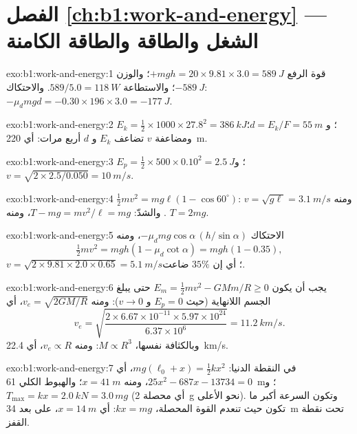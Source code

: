 \section*{الفصل \ref{ch:b1:work-and-energy} --- الشغل والطاقة والطاقة الكامنة}

\begin{solution}{exo:b1:work-and-energy:1}
قوة الرفع $+mgh = 20 \times 9.81 \times 3.0 = \qty{589}{J}$؛ والوزن
$-\qty{589}{J}$؛ والاستطاعة $589/5.0 = \qty{118}{W}$. والاحتكاك: $-\mu_dmgd =
-0.30 \times 196 \times 3.0 = \qty{-177}{J}$.
\end{solution}

\begin{solution}{exo:b1:work-and-energy:2}
$E_k = \tfrac12 \times 1000 \times 27.8^2 = \qty{386}{kJ}$؛ و $d = E_k/F =
\qty{55}{m}$؛ ومضاعفة $v$ تضاعف $E_k$ و $d$ أربع مرات: أي \qty{220}{m}.
\end{solution}

\begin{solution}{exo:b1:work-and-energy:3}
$E_p = \tfrac12 \times 500 \times 0.10^2 = \qty{2.5}{J}$؛ و $v = \sqrt{2 \times
2.5/0.050} = \qty{10}{m/s}$.
\end{solution}

\begin{solution}{exo:b1:work-and-energy:4}
$\tfrac12 mv^2 = mg\ell(1 - \cos 60^\circ)$: ومنه $v = \sqrt{g\ell} = \qty{3.1}{m/s}$.
والشدّ: $T - mg = mv^2/\ell = mg$، ومنه $T = 2mg$.
\end{solution}

\begin{solution}{exo:b1:work-and-energy:5}
 الاحتكاك $-\mu_dmg\cos\alpha\,(h/\sin\alpha)$، ومنه
\[
\tfrac12 mv^2 = mgh(1 - \mu_d\cot\alpha) = mgh(1 - 0.35),
\]
$v = \sqrt{2 \times 9.81 \times 2.0 \times 0.65} = \qty{5.1}{m/s}$؛ أي إن $35\%$ ضاعت.
\end{solution}

\begin{solution}{exo:b1:work-and-energy:6}
يجب أن يكون $E_m = \tfrac12 mv^2 - GMm/R \geq 0$ حتى يبلغ الجسم اللانهاية
(حيث $E_p = 0$ و $v \to 0$): ومنه $v_e = \sqrt{2GM/R}$، أي
\[
v_e = \sqrt{\frac{2 \times 6.67\times10^{-11} \times 5.97\times10^{24}}{6.37\times10^6}}
= \qty{11.2}{km/s}.
\]
وبالكثافة نفسها، $M \propto R^3$: ومنه $v_e \propto R$، أي \qty{22.4}{km/s}.
\end{solution}

\begin{solution}{exo:b1:work-and-energy:7}
في النقطة الدنيا: $mg(\ell_0 + x) = \tfrac12 kx^2$، أي $25x^2 - 687x - 13734 = 0$،
ومنه $x = \qty{41}{m}$؛ والهبوط الكلي \qty{61}{m}؛ و $T_{\max} = kx = \qty{2.0}{kN}
= 3.0\,mg$ (أي محصلة \qty{2}{g} نحو الأعلى). وتكون السرعة أكبر ما تكون حيث تنعدم
القوة المحصلة، $kx = mg$: أي $x = \qty{14}{m}$، على بعد \qty{34}{m} تحت نقطة القفز.
\end{solution}

